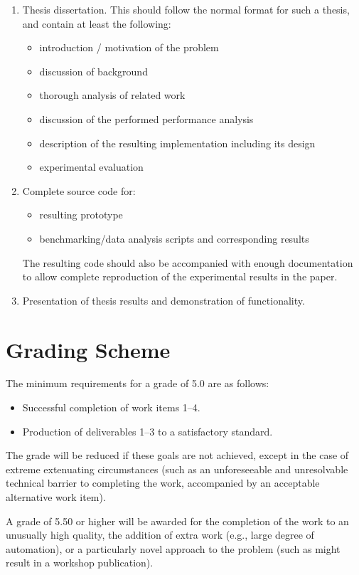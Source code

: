 \documentclass[10pt]{article}
\begin{document}
\begin{enumerate}
	\item  Thesis dissertation. This should follow the normal format for
	       such a thesis, and contain at least the following:
	\begin{itemize}
		\item introduction / motivation of the problem
		\item discussion of background
		\item thorough analysis of related work
		\item discussion of the performed performance analysis
		\item description of the resulting implementation including its
		      design
		\item experimental evaluation
	\end{itemize}
	\item Complete source code for:
	\begin{itemize}
		\item resulting prototype
		\item benchmarking/data analysis scripts and corresponding results
	\end{itemize}
		The resulting code should also be accompanied with enough
		documentation to allow complete reproduction of the
		experimental results in the paper.
	\item Presentation of thesis results and demonstration of
	      functionality.
\end{enumerate}


\section*{Grading Scheme}

The minimum requirements for a grade of 5.0 are as follows:

\begin{itemize}
	\item Successful completion of work items 1–4.
	\item Production of deliverables 1–3 to a satisfactory standard.
\end{itemize}

The grade will be reduced if these goals are not achieved, except in the case
of extreme extenuating circumstances (such as an unforeseeable and unresolvable
technical barrier to completing the work, accompanied by an acceptable
alternative work item).

A grade of 5.50 or higher will be awarded for the completion of the work to an
unusually high quality, the addition of extra work (e.g., large degree of
automation), or a particularly novel approach to the problem (such as might
result in a workshop publication).
\end{document}
